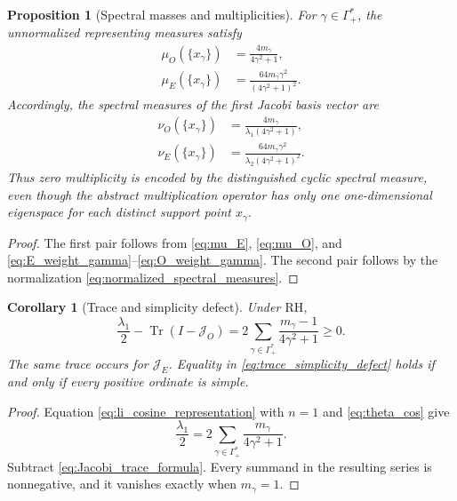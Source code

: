 \documentclass[11pt]{amsart}
\numberwithin{equation}{section}
\theoremstyle{plain}
\newtheorem{proposition}[theorem]{Proposition}
\newtheorem{corollary}[theorem]{Corollary}
\theoremstyle{definition}
\theoremstyle{remark}
\newcommand{\RH}{\mathrm{RH}}
\begin{document}
\begin{proposition}[Spectral masses and multiplicities]
\label{prop:spectral_multiplicity_weights}
For $\gamma\in\Gamma_+^*$, the unnormalized representing measures satisfy
\begin{align}
\mu_O(\{x_\gamma\})
&=\frac{4m_\gamma}{4\gamma^2+1},
\label{eq:muO_atom_mass}\\
\mu_E(\{x_\gamma\})
&=\frac{64m_\gamma\gamma^2}{(4\gamma^2+1)^2}.
\label{eq:muE_atom_mass}
\end{align}
Accordingly, the spectral measures of the first Jacobi basis vector are
\begin{align}
\nu_O(\{x_\gamma\})
&=\frac{4m_\gamma}{\lambda_1(4\gamma^2+1)},
\label{eq:nuO_atom_mass}\\
\nu_E(\{x_\gamma\})
&=\frac{64m_\gamma\gamma^2}{\lambda_2(4\gamma^2+1)^2}.
\label{eq:nuE_atom_mass}
\end{align}
Thus zero multiplicity is encoded by the distinguished cyclic spectral measure, even though the abstract multiplication operator has only one one-dimensional eigenspace for each distinct support point $x_\gamma$.
\end{proposition}

\begin{proof}
The first pair follows from \eqref{eq:mu_E}, \eqref{eq:mu_O}, and \eqref{eq:E_weight_gamma}--\eqref{eq:O_weight_gamma}. The second pair follows by the normalization \eqref{eq:normalized_spectral_measures}.
\end{proof}

\begin{corollary}[Trace and simplicity defect]
\label{cor:trace_simplicity_defect}
Under $\RH$,
\begin{equation}
\frac{\lambda_1}{2}
-
\operatorname{Tr}(I-\mathcal J_O)
=
2\sum_{\gamma\in\Gamma_+^*}
\frac{m_\gamma-1}{4\gamma^2+1}
\ge0.
\label{eq:trace_simplicity_defect}
\end{equation}
The same trace occurs for $\mathcal J_E$. Equality in \eqref{eq:trace_simplicity_defect} holds if and only if every positive ordinate is simple.
\end{corollary}

\begin{proof}
Equation \eqref{eq:li_cosine_representation} with $n=1$ and \eqref{eq:theta_cos} give
\begin{equation}
\frac{\lambda_1}{2}
=2\sum_{\gamma\in\Gamma_+^*}\frac{m_\gamma}{4\gamma^2+1}.
\label{eq:lambda1_multiplicity_sum}
\end{equation}
Subtract \eqref{eq:Jacobi_trace_formula}. Every summand in the resulting series is nonnegative, and it vanishes exactly when $m_\gamma=1$.
\end{proof}
\end{document}
